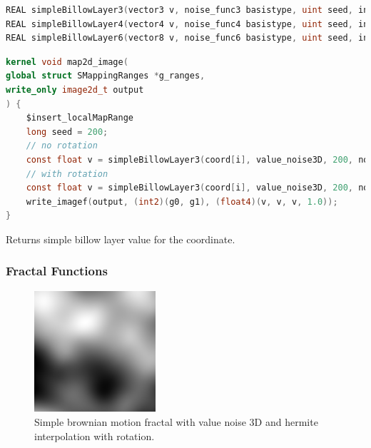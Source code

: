 \begin{lstlisting}[caption={Definition of billow fractal layer functions},label={lst:billow_fractal_layer_definition},language=OpenCL]
REAL simpleBillowLayer3(vector3 v, noise_func3 basistype, uint seed, interp_func interp, REAL layerscale, REAL layerfreq, bool rot, REAL angle, REAL ax, REAL ay, REAL az);
REAL simpleBillowLayer4(vector4 v, noise_func4 basistype, uint seed, interp_func interp, REAL layerscale, REAL layerfreq, bool rot, REAL angle, REAL ax, REAL ay, REAL az);
REAL simpleBillowLayer6(vector8 v, noise_func6 basistype, uint seed, interp_func interp, REAL layerscale, REAL layerfreq, bool rot, REAL angle, REAL ax, REAL ay, REAL az);
\end{lstlisting}

\begin{lstlisting}[caption={Example for billow fractal layer functions},label={lst:billow_fractal_layer_example},language=OpenCL]
kernel void map2d_image(
global struct SMappingRanges *g_ranges,
write_only image2d_t output
) {
    $insert_localMapRange
    long seed = 200;
    // no rotation
    const float v = simpleBillowLayer3(coord[i], value_noise3D, 200, noInterp, 1, 0.125, false, 0.0, 0.0, 0.0, 0.0);
    // with rotation
    const float v = simpleBillowLayer3(coord[i], value_noise3D, 200, noInterp, 1, 0.125, true, 1.57, 1.0, 0.0, 0.0);
    write_imagef(output, (int2)(g0, g1), (float4)(v, v, v, 1.0));
}
\end{lstlisting}

Returns simple billow layer value for the coordinate.

\subsubsection{Fractal Functions}

\begin{figure}[h]
\centering
\includegraphics[width=0.4\textwidth]{out/simplefBm3/simplefBm3_value_noise3D_hermiteInterp_rot.png}
\caption{Simple brownian motion fractal with value noise 3D and hermite interpolation with rotation.}
\label{fig:simple_bm3_value_noise3D_hermiteInterp_rot}
\end{figure}

